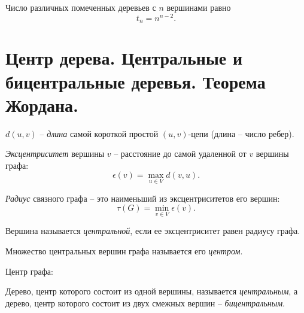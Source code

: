 \begin{theorem}[А. Кэли, 1889]
    Число различных помеченных деревьев с $ n $ вершинами равно
    \[
        t_n = n^{n-2}.
    \]
\end{theorem}

\section{Центр дерева. Центральные и бицентральные деревья. Теорема Жордана.}

\begin{note}
    $ d(u,v) $ -- \emph{длина} самой короткой простой $ (u,v) $-цепи (длина -- число ребер).
\end{note}

\begin{definition}[Эксцентриситет]
    \emph{Эксцентриситет} вершины $ v $ -- расстояние до самой удаленной от $ v $ вершины графа:
    \[
        \epsilon(v) = \underset{u \in V}{\max}d(v,u).
    \]
\end{definition}

\begin{definition}[Радиус]
    \emph{Радиус} связного графа -- это наименьший из эксцентриситетов его вершин:
    \[
        \tau(G) = \underset{v \in V}{\min}\epsilon(v).
    \]
\end{definition}

\begin{definition}
    Вершина называется \emph{центральной}, если ее эксцентриситет равен радиусу графа.
\end{definition}

\begin{definition}
    Множество центральных вершин графа называется его \emph{центром}.
\end{definition}

\begin{example}
    Центр графа:
    \begin{figure}[H]
        \centering
        \label{fig:fig_25}
    \end{figure}
\end{example}

\begin{definition}
    Дерево, центр которого состоит из одной вершины, называется \emph{центральным}, а дерево, центр которого состоит из двух смежных вершин -- \emph{бицентральным}.
\end{definition}

